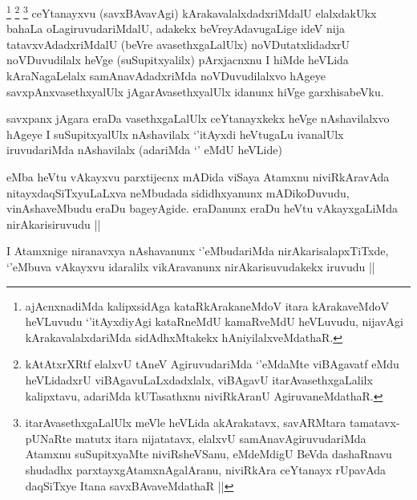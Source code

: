 \begin{artha}
\footnote{ajAcnxnadiMda kalipxsidAga kataRkArakaneMdoV itara kArakaveMdoV heVLuvudu `\stext'itAyxdiyAgi kataRneMdU kamaRveMdU heVLuvudu, nijavAgi kArakavalalxdariMda sidAdhxMtakekx hAniyilalxveMdathaR.}
\footnote{kAtAtxrXRtf elalxvU tAneV AgiruvudariMda `\stext'eMdaMte viBAgavatf eMdu heVLidadxrU viBAgavuLaLxdadxlalx, viBAgavU itarAvasethxgaLalilx kalipxtavu, adariMda kUTasathxnu niviRkAranU AgiruvaneMdathaR.}
\footnote{itarAvasethxgaLalUlx meVle heVLida akArakatavx, savARMtara tamatavx- pUNaRte matutx itara nijatatavx, elalxvU samAnavAgiruvudariMda Atamxnu suSupitxyaMte niviRsheVSanu, eMdeMdigU BeVda dashaRnavu shudadhx parxtayxgAtamxnAgalAranu, niviRkAra ceYtanayx rUpavAda daqSiTxye Itana savxBAvaveMdathaR ||}
ceYtanayxvu (savxBAvavAgi) kArakavalalxdadxriMdalU elalxdakUkx bahaLa oLagiruvudariMdalU, adakekx beVreyAdavugaLige ideV nija tatavxvAdadxriMdalU (beVre avasethxgaLalUlx) noVDutatxlidadxrU noVDuvudilalx heVge (suSupitxyalilx) pArxjacnxnu I hiMde heVLida kAraNagaLelalx samAnavAdadxriMda noVDuvudilalxvo hAgeye savxpAnxvasethxyalUlx jAgarAvasethxyalUlx idanunx hiVge garxhisabeVku.
\end{artha}



\begin{artha}
savxpanx jAgara eraDa vasethxgaLalUlx ceYtanayxkekx heVge nAshavilalxvo hAgeye I suSupitxyalUlx nAshavilalx `\stext'itAyxdi heVtugaLu ivanalUlx iruvudariMda nAshavilalx (adariMda `\stext' eMdU heVLide)
\end{artha}



\begin{artha}
eMba heVtu vAkayxvu parxtijecnx mADida viSaya Atamxnu niviRkAravAda nitayxdaqSiTxyuLaLxva neMbudada sididhxyanunx mADikoDuvudu, vinAshaveMbudu eraDu bageyAgide. eraDanunx eraDu heVtu vAkayxgaLiMda nirAkarisiruvudu ||
\end{artha}


\begin{artha}
I Atamxnige niranavxya nAshavanunx `\stext'eMbudariMda nirAkarisalapxTiTxde, `\stext'eMbuva vAkayxvu idaralilx vikAravanunx nirAkarisuvudakekx iruvudu ||
\end{artha}

